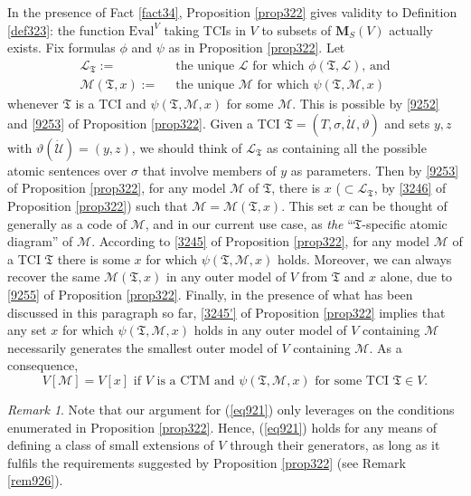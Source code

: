 \documentclass[12pt, twoside]{memoir}
\numberwithin{equation}{section}
\theoremstyle{definition}
\theoremstyle{remark}
\newtheorem{rem}[thm]{Remark}
\theoremstyle{definition}
\theoremstyle{definition}
\theoremstyle{definition}
\theoremstyle{remark}
\begin{document}
In the presence of Fact \ref{fact34}, Proposition \ref{prop322} gives validity to Definition \ref{def323}: the function $\mathrm{Eval}^V$ taking TCIs in $V$ to subsets of $\mathbf{M}_S(V)$ actually exists. Fix formulas $\phi$ and $\psi$ as in Proposition \ref{prop322}. Let 
\begin{align*}
    \mathcal{L}_{\mathfrak{T}} := \ & \text{ the unique } \mathcal{L} \text{ for which } \phi(\mathfrak{T}, \mathcal{L}) \text{, and} \\
    \mathcal{M}(\mathfrak{T}, x) := \ & \text{ the unique } \mathcal{M} \text{ for which } \psi(\mathfrak{T}, \mathcal{M}, x)
\end{align*}
whenever $\mathfrak{T}$ is a TCI and $\psi(\mathfrak{T}, \mathcal{M}, x)$ for some $\mathcal{M}$. This is possible by \ref{9252} and \ref{9253} of Proposition \ref{prop322}. Given a TCI $\mathfrak{T} = (T, \sigma, \dot{\mathcal{U}}, \vartheta)$ and sets $y, z$ with $\vartheta(\dot{\mathcal{U}}) = (y, z)$, we should think of $\mathcal{L}_{\mathfrak{T}}$ as containing all the possible atomic sentences over $\sigma$ that involve members of $y$ as parameters. Then by \ref{9253} of Proposition \ref{prop322}, for any model $\mathcal{M}$ of $\mathfrak{T}$, there is $x$ ($\subset \mathcal{L}_{\mathfrak{T}}$, by \ref{3246} of Proposition \ref{prop322}) such that $\mathcal{M} = \mathcal{M}(\mathfrak{T}, x)$. This set $x$ can be thought of generally as a code of $\mathcal{M}$, and in our current use case, as \textit{the} ``$\mathfrak{T}$-specific atomic diagram''  of $\mathcal{M}$. According to \ref{3245} of Proposition \ref{prop322}, for any model $\mathcal{M}$ of a TCI $\mathfrak{T}$ there is some $x$ for which $\psi(\mathfrak{T}, \mathcal{M}, x)$ holds. Moreover, we can always recover the same $\mathcal{M}(\mathfrak{T}, x)$ in any outer model of $V$ from $\mathfrak{T}$ and $x$ alone, due to \ref{9255} of Proposition \ref{prop322}. Finally, in the presence of what has been discussed in this paragraph so far, \ref{3245'} of Proposition \ref{prop322} implies that any set $x$ for which $\psi(\mathfrak{T}, \mathcal{M}, x)$ holds in any outer model of $V$ containing $\mathcal{M}$ necessarily generates the smallest outer model of $V$ containing $\mathcal{M}$. As a consequence, 
\begin{equation}\label{eq921}
    V[\mathcal{M}] = V[x] \text{ if } V \text{ is a CTM and } \psi(\mathfrak{T}, \mathcal{M}, x) \text{ for some TCI } \mathfrak{T} \in V \text{.}
\end{equation}

\begin{rem}\label{rem927}
Note that our argument for (\ref{eq921}) only leverages on the conditions enumerated in Proposition \ref{prop322}. Hence, (\ref{eq921}) holds for any means of defining a class of small extensions of $V$ through their generators, as long as it fulfils the requirements suggested by Proposition \ref{prop322} (see Remark \ref{rem926}).
\end{rem}
\end{document}
